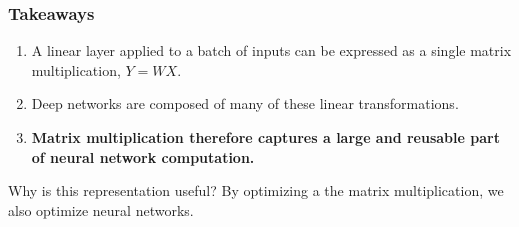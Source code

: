 \documentclass[main.tex]{subfiles}
\begin{document}

%   




\begin{frame}
  \frametitle{Takeaways}
  \begin{enumerate}
    \item A linear layer applied to a batch of inputs can be expressed as a single
      matrix multiplication, \(Y = WX\).
    \item Deep networks are composed of many of these linear transformations.
    \item \textbf{Matrix multiplication therefore captures a large and reusable part of
      neural network computation.}
  \end{enumerate}

  \begin{alertblock}{Why is this representation useful?}
    By optimizing a the matrix multiplication, we also optimize neural networks.
  \end{alertblock}
\end{frame}
\end{document}
